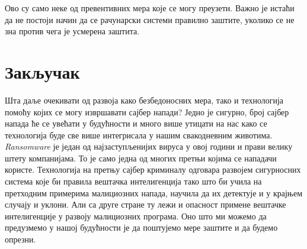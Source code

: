 \documentclass[a4paper]{article}
\begin{document}
	Ово су само неке од превентивних мера које се могу преузети. Важно је истаћи да не постоји начин да се рачунарски системи правилно заштите, уколико се не зна против чега је усмерена заштита.
	\section{Закључак}
	\label{sec:Zakljucak}
	Шта даље очекивати од развоја како безбедоносних мера, тако и технологија помоћу којих се могу извршавати сајбер напади? Једно је сигурно, број сајбер напада ће се увећати у будућности и много више утицати на нас како се технологија буде све више интегрисала у нашим свакодневним животима. {\em Ransomware} је један од најзаступљени\-јих вируса у овој години и прави велику штету компанијама. То је само једна од многих претњи којима се нападачи користе. Технологија на претњу сајбер криминалу одговара развојем сигурносних система које би правила вештачка интелигенција тако што би учила на претходним примерима малициозних напада, научила да их детектује и у крајњем случају и уклони. Али са друге стране ту лежи и опасност примене вештачке интелигенције у развоју малициозних програма. Оно што ми можемо да предузмемо у нашој будућности је да поштујемо мере заштите и да будемо опрезни. 
\end{document}
